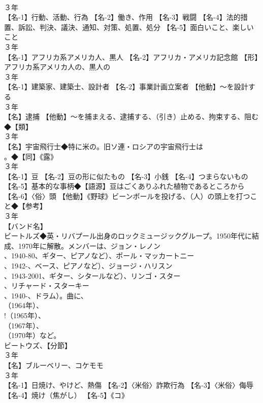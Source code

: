 \documentclass[8pt]{extreport}
\begin{document}
\begin{CJK}{UTF8}{min}
\\	３年	
\\	【名-1】行動、活動、行為 【名-2】働き、作用 【名-3】戦闘 【名-4】法的措置、訴訟、判決、議決、通知、対策、処置、処分 【名-5】面白いこと、楽しいこと
\\	３年	
\\	【名-1】アフリカ系アメリカ人、黒人 【名-2】アフリカ・アメリカ記念館 【形】アフリカ系アメリカ人の、黒人の
\\	３年	
\\	【名-1】建築家、建築士、設計者 【名-2】事業計画立案者 【他動】～を設計する
\\	３年	
\\	【名】逮捕 【他動】～を捕まえる、逮捕する、（引き）止める、拘束する、阻む◆【類】
\\	３年	
\\	【名】宇宙飛行士◆特に米の。旧ソ連・ロシアの宇宙飛行士は 
\\	。◆【同】《露》
\\	３年	
\\	【名-1】豆 【名-2】豆の形に似たもの 【名-3】小銭 【名-4】つまらないもの 【名-5】基本的な事柄◆【語源】豆はごくありふれた植物であるところから 【名-6】〈俗〉頭 【他動】《野球》ビーンボールを投げる、（人）の頭上を打つこと◆【参考】
\\	３年	
\\	【バンド名】
\\	ビートルズ◆英・リバプール出身のロックミュージックグループ。1950年代に結成、1970年に解散。メンバーは、ジョン・レノン
\\	、1940-80、ギター、ピアノなど）、ポール・マッカートニー
\\	、1942-、ベース、ピアノなど）、ジョージ・ハリスン
\\	、1943-2001、ギター、シタールなど）、リンゴ・スター
\\	、リチャード・スターキー
\\	、1940-、ドラム）。曲に、
\\	（1964年）、
\\	!（1965年）、
\\	（1967年）、
\\	（1970年）など。 
\\	ビートウズ、【分節】
\\	３年	
\\	【名】ブルーベリー、コケモモ
\\	３年	
\\	【名-1】日焼け、やけど、熱傷 【名-2】〈米俗〉詐欺行為 【名-3】〈米俗〉侮辱 【名-4】焼け（焦がし） 【名-5】《コ》

\end{CJK}
\end{document}
